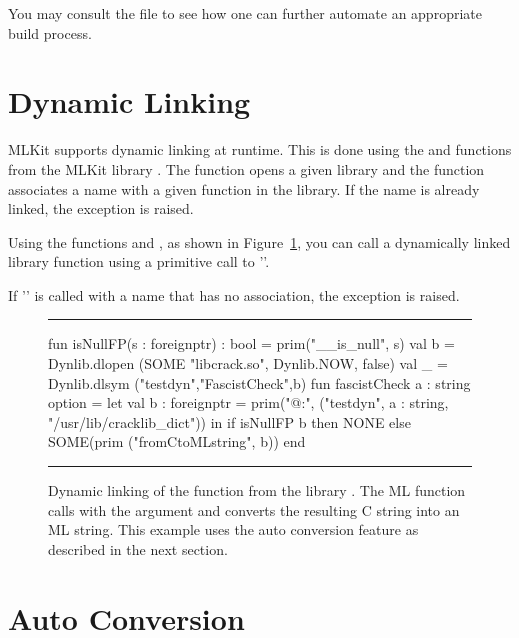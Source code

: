 \documentclass[12pt]{book}
\begin{document}
You may consult the file  to see how one can further
automate an appropriate build process.

\section{Dynamic Linking}
\label{link_at_runtime.sec}

MLKit supports
%
%
%
dynamic linking at runtime.  This is done using the
%
%
%
%
 and  functions from the MLKit library
. The function  opens a given library and the
function  associates a name with a given function in the library. If
the name is already linked, the exception  is raised.

Using the functions  and , as shown in
Figure~\ref{dynlib.fig}, you can call a dynamically linked library function
using a primitive call to '\kw{:}'.

If '\kw{:}' is called with a name that has no association, the exception
 is raised.
\begin{figure}
\hrule \medskip
\begin{smlcode}
  fun isNullFP(s : foreignptr) : bool = prim("__is_null", s)
  val b = Dynlib.dlopen (SOME "libcrack.so", Dynlib.NOW, false)
  val _ = Dynlib.dlsym ("testdyn","FascistCheck",b)
  fun fascistCheck a : string option =
    let val b : foreignptr =
      prim("@:", ("testdyn", a : string,
                  "/usr/lib/cracklib_dict"))
    in if isNullFP b
       then NONE
       else SOME(prim ("fromCtoMLstring", b))
    end
\end{smlcode}
\caption{Dynamic linking of the function  from the library
  .  The ML function  calls 
  with the argument  and converts the resulting
  C string into an ML string.  This example uses the auto conversion feature as
  described in the next section.}
\label{dynlib.fig}
\medskip \hrule
\end{figure}

\section{Auto Conversion}
\label{auto_conversion.sec}
\end{document}
